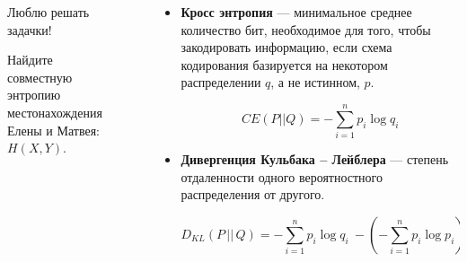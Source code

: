 \documentclass[final]{beamer}
\newlength{\sepwid}
\newlength{\onecolwid}
\newlength{\twocolwid}
\begin{document}
\begin{frame}[t]
\begin{columns}[t]
\begin{column}{\onecolwid}
\begin{alertblock}{Люблю решать задачки!}
\begin{enumerate}
		Найдите совместную энтропию местонахождения Елены и Матвея: $H(X, Y)$. 
	\end{enumerate}
    
\end{alertblock}




\end{column} %

\begin{column}{\sepwid}\end{column} %

\begin{column}{\twocolwid} %

\begin{columns}[t,totalwidth=\twocolwid] %

\begin{column}{\onecolwid}\vspace{-.6in} %




\begin{itemize}
	\item \textbf{Кросс энтропия} --- минимальное среднее количество бит, необходимое для того, чтобы закодировать информацию, если схема кодирования базируется на некотором распределении $q$, а не истинном, $p$.
	
	\[CE(P||Q)=-\sum\limits_{i=1}^{n}p_i\log q_i \]
	
	\item \textbf{Дивергенция Кульбака -- Лейблера} --- степень отдаленности одного вероятностного распределения от другого.
	
	\[D_{KL}(P\, ||\, Q)=  - \sum\limits_{i=1}^n p_i\log q_i\ - ( - \sum\limits_{i=1}^n p_i\log p_i)\]
\end{itemize}
	


\end{column}
\end{columns}
\end{column}
\end{columns}
\end{frame}
\end{document}
